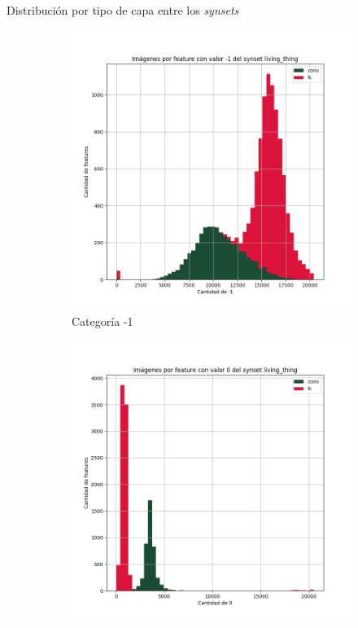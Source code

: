 \documentclass{beamer}
\begin{document}
\begin{frame}{Distribución por tipo de capa entre los \textit{synsets}}

\begin{figure}[ht] 
	\centering
	\begin{subfigure}[b]{0.32\textwidth}
		\includegraphics[width=\textwidth] {Images/plots/25/synsets/Images_per_feature_of_-1_category_living_thingall_layers.png}
		\caption{Categoría -1}
	\end{subfigure}
	\begin{subfigure}[b]{0.3\textwidth}
		\includegraphics[width=\textwidth]  {Images/plots/25/synsets/Images_per_feature_of_0_category_living_thingall_layers.png}

\end{subfigure}
\end{figure}
\end{frame}
\end{document}
